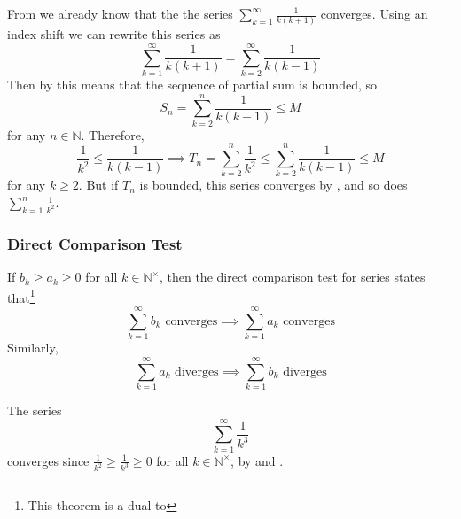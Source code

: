 \begin{exm}\label{exm-positive-series:1}
	From  we already know that the the series
	$\sum_{k=1}^\infty \frac{1}{k(k+1)}$ converges. Using an index shift we can
	rewrite this series as
	\begin{equation*}
		\sum_{k=1}^\infty \frac{1}{k(k+1)} = \sum_{k=2}^\infty \frac{1}{k(k-1)}
	\end{equation*}
	Then by  this means that the sequence
	of partial sum is bounded, so
	\begin{equation*}
		S_n = \sum_{k=2}^n \frac{1}{k(k-1)} \leq M
	\end{equation*}
	for any $n\in\mathbb{N}$. Therefore,
	\begin{equation*}
		\frac{1}{k^2} \leq \frac{1}{k(k-1)} \implies T_n = \sum_{k=2}^n \frac{1}{k^2} \leq \sum_{k=2}^n \frac{1}{k(k-1)} \leq M
	\end{equation*}
	for any $k\geq2$. But if $T_n$ is bounded, this series converges by
	, and so does $\sum_{k=1}^n \frac{1}{k^2}$.
\end{exm}

\subsubsection{Direct Comparison Test}\label{subsubsec-direct-comparison-test-series}

\begin{thm}\label{thm-direct-comparison-test-series}
	If $b_k \geq a_k \geq 0$ for all $k\in\mathbb{N}^\times$, then the direct comparison test
	for series states that\footnote{This theorem is a dual to }
	\begin{equation*}
		\sum_{k=1}^\infty b_k \text{ converges} \implies \sum_{k=1}^\infty a_k \text{ converges}
	\end{equation*}
	Similarly,
	\begin{equation*}
		\sum_{k=1}^\infty a_k \text{ diverges} \implies \sum_{k=1}^\infty b_k \text{ diverges}
	\end{equation*}
\end{thm}

\begin{exm}\label{exm-positive-series:2}
	The series
	\begin{equation*}
		\sum_{k=1}^\infty \frac{1}{k^3}
	\end{equation*}
	converges since $\tfrac{1}{k^2}\geq\frac{1}{k^3}\geq0$ for all $k\in\mathbb{N}^\times$,
	by  and .
\end{exm}

